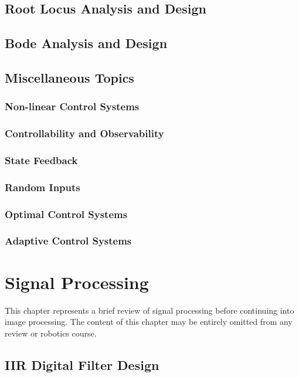 \documentclass[11pt]{book}
\theoremstyle{example}
\begin{document}
\section{Root Locus Analysis and Design}

\section{Bode Analysis and Design}

\section{Miscellaneous Topics}

\subsection{Non-linear Control Systems}

\subsection{Controllability and Observability}

\subsection{State Feedback}

\subsection{Random Inputs}

\subsection{Optimal Control Systems}

\subsection{Adaptive Control Systems}

\chapter{Signal Processing}

This chapter represents a brief review of signal processing before continuing into image processing. The content of this chapter may be entirely omitted from any review or robotics course.

\section{IIR Digital Filter Design}
\end{document}
